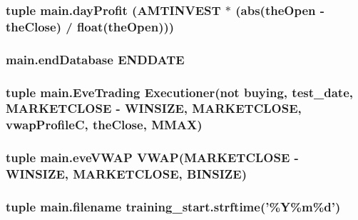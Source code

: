 \hypertarget{namespacemain_a26df9d6e1bf44bd992060b30c6a7a403}{
\subsubsection[{day\-Profit}]{\setlength{\rightskip}{0pt plus 5cm}tuple main.\-day\-Profit (A\-M\-T\-I\-N\-V\-E\-S\-T $\ast$ (abs({\bf the\-Open} -\/ {\bf the\-Close}) / float({\bf the\-Open})))}}\label{namespacemain_a26df9d6e1bf44bd992060b30c6a7a403}
\hypertarget{namespacemain_a77925137ac37065898ded0ba59cec7c7}{
\subsubsection[{end\-Database}]{\setlength{\rightskip}{0pt plus 5cm}main.\-end\-Database E\-N\-D\-D\-A\-T\-E}}\label{namespacemain_a77925137ac37065898ded0ba59cec7c7}
\hypertarget{namespacemain_a55b19868bf4a9d05834347d658030e7f}{
\subsubsection[{Eve\-Trading}]{\setlength{\rightskip}{0pt plus 5cm}tuple main.\-Eve\-Trading {\bf Executioner}(not {\bf buying}, test\-\_\-date, M\-A\-R\-K\-E\-T\-C\-L\-O\-S\-E -\/ W\-I\-N\-S\-I\-Z\-E, M\-A\-R\-K\-E\-T\-C\-L\-O\-S\-E, {\bf vwap\-Profile\-C}, {\bf the\-Close}, M\-M\-A\-X)}}\label{namespacemain_a55b19868bf4a9d05834347d658030e7f}
\hypertarget{namespacemain_ab8560876136311d8e4a19ff8fc2cfeff}{
\subsubsection[{eve\-V\-W\-A\-P}]{\setlength{\rightskip}{0pt plus 5cm}tuple main.\-eve\-V\-W\-A\-P {\bf V\-W\-A\-P}(M\-A\-R\-K\-E\-T\-C\-L\-O\-S\-E -\/ W\-I\-N\-S\-I\-Z\-E, M\-A\-R\-K\-E\-T\-C\-L\-O\-S\-E, B\-I\-N\-S\-I\-Z\-E)}}\label{namespacemain_ab8560876136311d8e4a19ff8fc2cfeff}
\hypertarget{namespacemain_a50e2bb2c2453d804e5d6b3a5b74c1cf1}{
\subsubsection[{filename}]{\setlength{\rightskip}{0pt plus 5cm}tuple main.\-filename training\-\_\-start.\-strftime('\%Y\%{\bf m}\%d')}}\label{namespacemain_a50e2bb2c2453d804e5d6b3a5b74c1cf1}
